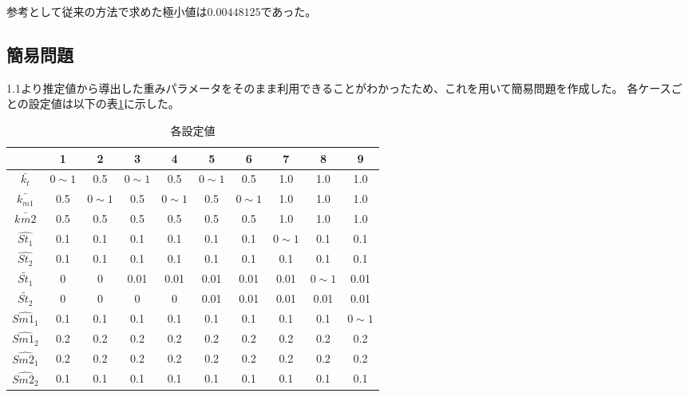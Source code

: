 \documentclass[a4paper,11pt]{jsarticle}
\begin{document}
参考として従来の方法で求めた極小値は$0.00448125$であった。

\subsection{簡易問題}
1.1より推定値から導出した重みパラメータをそのまま利用できることがわかったため、これを用いて簡易問題を作成した。
各ケースごとの設定値は以下の表\ref{table:5}に示した。

\begin{table}[H]
  \centering
  \caption{各設定値}
  \begin{tabular}{|c||c|c|c|c|c|c|c|c|c|}
  \hline
                   & 1          & 2          & 3          & 4          & 5          & 6          & 7          & 8          & 9          \\ \hline \hline
  $\bar{k_{t}}$    & $0 \sim 1$ & 0.5        & $0 \sim 1$ & 0.5        & $0 \sim 1$ & 0.5        & 1.0        & 1.0        & 1.0        \\ \hline
  $\bar{k_{m1}}$   & 0.5        & $0 \sim 1$ & 0.5        & $0 \sim 1$ & 0.5        & $0 \sim 1$ & 1.0        & 1.0        & 1.0        \\ \hline
  $\bar{k_{}m2}$   & 0.5        & 0.5        & 0.5        & 0.5        & 0.5        & 0.5        & 1.0        & 1.0        & 1.0        \\ \hline
  $\hat{St_{1}}$   & 0.1        & 0.1        & 0.1        & 0.1        & 0.1        & 0.1        & $0 \sim 1$ & 0.1        & 0.1        \\ \hline
  $\hat{St_{2}}$   & 0.1        & 0.1        & 0.1        & 0.1        & 0.1        & 0.1        & 0.1        & 0.1        & 0.1        \\ \hline
  $\tilde{St_{1}}$ & 0          & 0          & 0.01       & 0.01       & 0.01       & 0.01       & 0.01       & $0 \sim 1$ & 0.01       \\ \hline
  $\tilde{St_{2}}$ & 0          & 0          & 0          & 0          & 0.01       & 0.01       & 0.01       & 0.01       & 0.01       \\ \hline
  $\hat{Sm1_{1}}$  & 0.1        & 0.1        & 0.1        & 0.1        & 0.1        & 0.1        & 0.1        & 0.1        & $0 \sim 1$ \\ \hline
  $\hat{Sm1_{2}}$  & 0.2        & 0.2        & 0.2        & 0.2        & 0.2        & 0.2        & 0.2        & 0.2        & 0.2        \\ \hline
  $\hat{Sm2_{1}}$  & 0.2        & 0.2        & 0.2        & 0.2        & 0.2        & 0.2        & 0.2        & 0.2        & 0.2        \\ \hline
  $\hat{Sm2_{2}}$  & 0.1        & 0.1        & 0.1        & 0.1        & 0.1        & 0.1        & 0.1        & 0.1        & 0.1        \\ \hline
  \end{tabular}
  \label{table:5}
\end{table}
\end{document}
